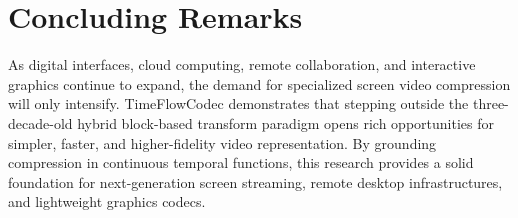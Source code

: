 \section{Concluding Remarks}
As digital interfaces, cloud computing, remote collaboration, and interactive graphics continue to expand, the demand for specialized screen video compression will only intensify. TimeFlowCodec demonstrates that stepping outside the three-decade-old hybrid block-based transform paradigm opens rich opportunities for simpler, faster, and higher-fidelity video representation. By grounding compression in continuous temporal functions, this research provides a solid foundation for next-generation screen streaming, remote desktop infrastructures, and lightweight graphics codecs.
